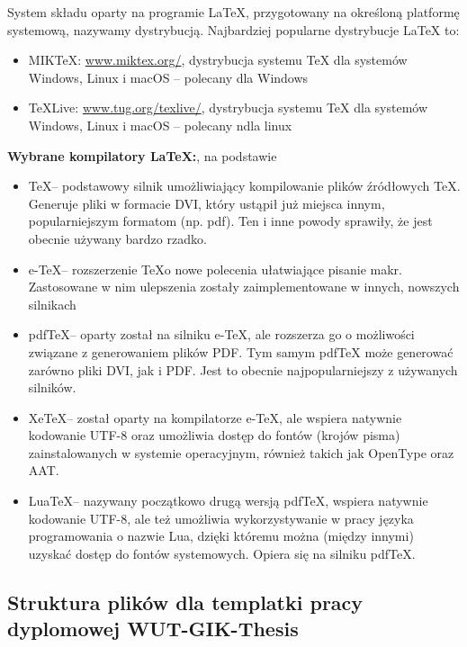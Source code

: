 System składu oparty na programie \LaTeX{}, przygotowany na określoną platformę systemową, nazywamy dystrybucją. Najbardziej popularne dystrybucje \LaTeX{} to:
\begin{itemize}
    \item MIK\TeX: \url{www.miktex.org/}, dystrybucja systemu {\TeX} dla systemów Windows, Linux i macOS -- polecany dla Windows \\
    \item \TeX Live: \url{www.tug.org/texlive/}, dystrybucja systemu {\TeX} dla systemów Windows, Linux i macOS -- polecany ndla linux\\
\end{itemize}


\textbf{Wybrane kompilatory \LaTeX{}:}, na podstawie \citep{Borkowski.Przybylski2015}
\begin{itemize}
    \item \TeX -- podstawowy silnik umożliwiający kompilowanie plików źródłowych \TeX. Generuje pliki w formacie DVI, który ustąpił już miejsca innym, popularniejszym formatom (np. pdf). Ten i inne powody sprawiły, że jest obecnie używany bardzo rzadko.
    \item e-\TeX -- rozszerzenie \TeX o nowe polecenia ułatwiające pisanie makr. Zastosowane w nim ulepszenia zostały zaimplementowane w innych, nowszych silnikach
    \item pdf\TeX -- oparty został na silniku e-\TeX, ale rozszerza go o możliwości związane z generowaniem plików PDF. Tym samym pdfTeX może generować zarówno pliki DVI, jak i PDF. Jest to obecnie najpopularniejszy z używanych silników.
    \item Xe\TeX -- został oparty na kompilatorze e-\TeX, ale wspiera natywnie kodowanie UTF-8 oraz umożliwia dostęp do fontów (krojów pisma) zainstalowanych w systemie operacyjnym, również takich jak OpenType oraz AAT. 
    \item Lua\TeX -- nazywany początkowo drugą wersją pdf\TeX, wspiera natywnie kodowanie UTF-8, ale też umożliwia wykorzystywanie w pracy języka programowania o nazwie Lua, dzięki któremu można (między innymi) uzyskać dostęp do fontów systemowych. Opiera się na silniku pdfTeX.
\end{itemize}


\newpage
\subsection{Struktura plików dla templatki pracy dyplomowej WUT-GIK-Thesis}

